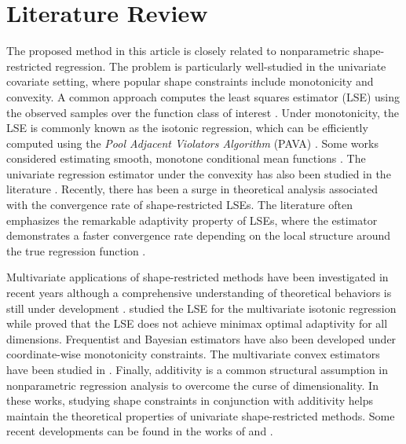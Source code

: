 \documentclass[12pt]{article}
\begin{document}
\section{Literature Review}\label{sec:lit-review}
The proposed method in this article is closely related to nonparametric shape-restricted regression. The problem is particularly well-studied in the univariate covariate setting, where popular shape constraints include monotonicity and convexity. A common approach computes the least squares estimator (LSE) using the observed samples over the function class of interest \citep{guntuboyina2018nonparametric}. Under monotonicity, the LSE is commonly known as the isotonic regression, which can be efficiently computed using the \textit{Pool Adjacent Violators Algorithm} (PAVA) \citep{ayer1955empirical}. Some works considered estimating smooth, monotone conditional mean functions \citep{mammen1991estimating,dette2006simple}. The univariate regression estimator under the convexity has also been studied in the literature \citep{groeneboom2001estimation, guntuboyina2015global, ghosal2017univariate}. Recently, there has been a surge in theoretical analysis associated with the convergence rate of shape-restricted LSEs. The literature often emphasizes the remarkable adaptivity property of LSEs, where the estimator demonstrates a faster convergence rate depending on the local structure around the true regression function \citep{zhang2002risk, chatterjee2015risk, guntuboyina2018nonparametric, bellec2018sharp}. 

Multivariate applications of shape-restricted methods have been investigated in recent years although a comprehensive understanding of theoretical behaviors is still under development \citep{guntuboyina2018nonparametric}. \cite{han2019isotonic} studied the LSE for the multivariate isotonic regression while \cite{deng2020isotonic} proved that the LSE does not achieve minimax optimal adaptivity for all dimensions. Frequentist \citep{han2020limit} and Bayesian \citep{wang2023posterior} estimators have also been developed under coordinate-wise monotonicity constraints. The multivariate convex estimators have been studied in \cite{seijo2011nonparametric, han2016multivariate, kur2020convex, kur2022efficient, o2023spectrahedral}. Finally, additivity is a common structural assumption in nonparametric regression analysis to overcome the curse of dimensionality. In these works, studying shape constraints in conjunction with additivity helps maintain the theoretical properties of univariate shape-restricted methods. Some recent developments can be found in the works of \cite{mammen2007additive, chen2016generalized} and \cite{han2018robustness}. 
\end{document}
